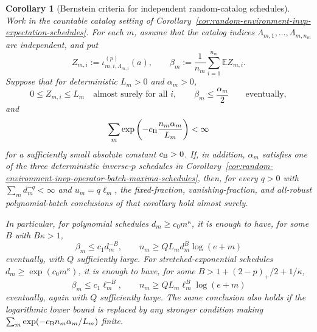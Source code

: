 \documentclass[11pt]{amsart}
\numberwithin{equation}{section}
\newtheorem{corollary}[theorem]{Corollary}
\theoremstyle{definition}
\theoremstyle{remark}
\newcommand{\Exp}{\mathbb E}
\begin{document}
\begin{corollary}[Bernstein criteria for independent random-catalog schedules]
\label{cor:random-environment-invp-bernstein-catalog-schedules}
Work in the countable catalog setting of
Corollary~\ref{cor:random-environment-invp-expectation-schedules}.  For each
\(m\), assume that the catalog indices
\(\Lambda_{m,1},\ldots,\Lambda_{m,n_m}\) are independent, and put
\[
  Z_{m,i}:=\iota_{m,i,\Lambda_{m,i}}^{(p)}(a),
  \qquad
  \beta_m:=\frac1{n_m}\sum_{i=1}^{n_m}\Exp Z_{m,i}.
\]
Suppose that for deterministic \(L_m>0\) and \(\alpha_m>0\),
\[
  0\le Z_{m,i}\le L_m\quad\text{almost surely for all }i,
  \qquad
  \beta_m\le \frac{\alpha_m}{2}
  \qquad\text{eventually},
\]
and
\[
  \sum_m \exp\left(-c_{\rm B}\frac{n_m\alpha_m}{L_m}\right)<\infty
\]
for a sufficiently small absolute constant \(c_{\rm B}>0\).  If, in addition,
\(\alpha_m\) satisfies one of the three deterministic inverse-\(p\) schedules in
Corollary~\ref{cor:random-environment-invp-operator-batch-maxima-schedules},
then, for every \(q>0\) with \(\sum_m d_m^{-q}<\infty\) and \(u_m=q\ell_m\),
the fixed-fraction, vanishing-fraction, and all-robust polynomial-batch
conclusions of that corollary hold almost surely.

In particular, for polynomial schedules \(d_m\ge c_0m^\kappa\), it is enough to
have, for some \(B\) with \(B\kappa>1\),
\[
  \beta_m\le c_1d_m^{-B},
  \qquad
  n_m\ge Q L_m d_m^B\log(e+m)
\]
eventually, with \(Q\) sufficiently large.  For stretched-exponential schedules
\(d_m\ge\exp(c_0m^\kappa)\), it is enough to have, for some
\(B>1+(2-p)_+/2+1/\kappa\),
\[
  \beta_m\le c_1\ell_m^{-B},
  \qquad
  n_m\ge Q L_m\ell_m^B\log(e+m)
\]
eventually, again with \(Q\) sufficiently large.  The same conclusion also
holds if the logarithmic lower bound is replaced by any stronger condition
making \(\sum_m\exp(-c_{\rm B}n_m\alpha_m/L_m)\) finite.
\end{corollary}
\end{document}
